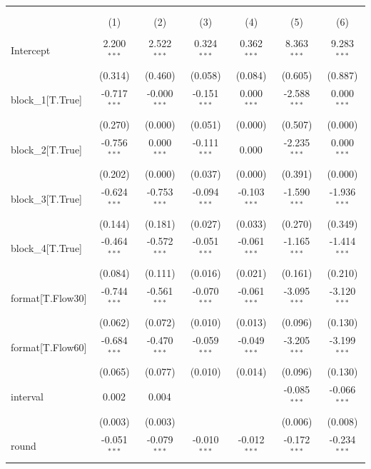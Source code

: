 \begin{table}[!htbp] \centering
\begin{tabular}{@{\extracolsep{5pt}}lcccccc}
\\[-1.8ex]\hline
\hline \\[-1.8ex]
\\[-1.8ex] & (1) & (2) & (3) & (4) & (5) & (6) \\
\hline \\[-1.8ex]
 Intercept & 2.200$^{***}$ & 2.522$^{***}$ & 0.324$^{***}$ & 0.362$^{***}$ & 8.363$^{***}$ & 9.283$^{***}$ \\
& (0.314) & (0.460) & (0.058) & (0.084) & (0.605) & (0.887) \\
 block_1[T.True] & -0.717$^{***}$ & -0.000$^{***}$ & -0.151$^{***}$ & 0.000$^{***}$ & -2.588$^{***}$ & 0.000$^{***}$ \\
& (0.270) & (0.000) & (0.051) & (0.000) & (0.507) & (0.000) \\
 block_2[T.True] & -0.756$^{***}$ & 0.000$^{***}$ & -0.111$^{***}$ & 0.000$^{}$ & -2.235$^{***}$ & 0.000$^{***}$ \\
& (0.202) & (0.000) & (0.037) & (0.000) & (0.391) & (0.000) \\
 block_3[T.True] & -0.624$^{***}$ & -0.753$^{***}$ & -0.094$^{***}$ & -0.103$^{***}$ & -1.590$^{***}$ & -1.936$^{***}$ \\
& (0.144) & (0.181) & (0.027) & (0.033) & (0.270) & (0.349) \\
 block_4[T.True] & -0.464$^{***}$ & -0.572$^{***}$ & -0.051$^{***}$ & -0.061$^{***}$ & -1.165$^{***}$ & -1.414$^{***}$ \\
& (0.084) & (0.111) & (0.016) & (0.021) & (0.161) & (0.210) \\
 format[T.Flow30] & -0.744$^{***}$ & -0.561$^{***}$ & -0.070$^{***}$ & -0.061$^{***}$ & -3.095$^{***}$ & -3.120$^{***}$ \\
& (0.062) & (0.072) & (0.010) & (0.013) & (0.096) & (0.130) \\
 format[T.Flow60] & -0.684$^{***}$ & -0.470$^{***}$ & -0.059$^{***}$ & -0.049$^{***}$ & -3.205$^{***}$ & -3.199$^{***}$ \\
& (0.065) & (0.077) & (0.010) & (0.014) & (0.096) & (0.130) \\
 interval & 0.002$^{}$ & 0.004$^{}$ & & & -0.085$^{***}$ & -0.066$^{***}$ \\
& (0.003) & (0.003) & & & (0.006) & (0.008) \\
 round & -0.051$^{***}$ & -0.079$^{***}$ & -0.010$^{***}$ & -0.012$^{***}$ & -0.172$^{***}$ & -0.234$^{***}$ \\

\end{tabular}
\end{table}
